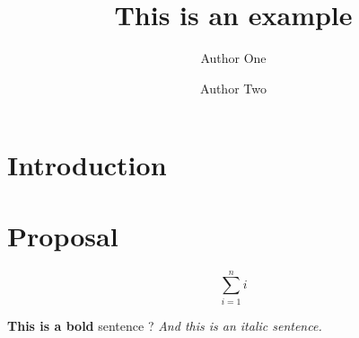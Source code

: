 \documentclass{class-for-drafts}
\title{This is an example}
\author{Author One \and Author Two}
\begin{document}
\maketitle

\section{Introduction}

\lipsum[1-3]

\section{Proposal}

\lipsum[1]

\begin{equation}
\sum_{i=1}^{n} i
\end{equation}


\textbf{This is a bold} sentence ?
\emph{And this is an italic sentence.}
\end{document}
